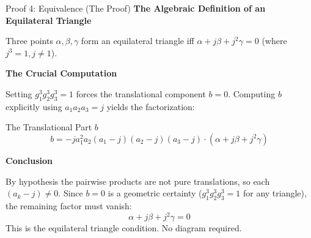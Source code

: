 \documentclass[aspectratio=169,10pt]{beamer}
\begin{document}
\begin{frame}{Proof 4: Equivalence (The Proof)}
\small
\textbf{The Algebraic Definition of an Equilateral Triangle}
\vspace{0.1cm}

Three points $\alpha, \beta, \gamma$ form an equilateral triangle iff $\alpha + j\beta + j^2\gamma = 0$ (where $j^3 = 1, j \neq 1$).

\vspace{0.1cm}
\textbf{The Crucial Computation}
\vspace{0.1cm}

Setting $g_1^3 g_2^3 g_3^3 = 1$ forces the translational component $b = 0$. Computing $b$ explicitly using $a_1 a_2 a_3 = j$ yields the factorization:

\vspace{-0.1cm}
\begin{block}{\footnotesize The Translational Part $b$}
\footnotesize
\[ b = -j a_1^2 a_2 (a_1 - j) (a_2 - j) (a_3 - j) \cdot (\alpha + j\beta + j^2\gamma) \]
\end{block}
\vspace{-0.1cm}

\textbf{Conclusion}
\vspace{0.1cm}

By hypothesis the pairwise products are not pure translations, so each $(a_k - j) \neq 0$. Since $b = 0$ is a geometric certainty ($g_1^3 g_2^3 g_3^3 = 1$ for any triangle), the remaining factor must vanish:
\[ \alpha + j\beta + j^2\gamma = 0 \]
This is the equilateral triangle condition. No diagram required.
\end{frame}
\end{document}
